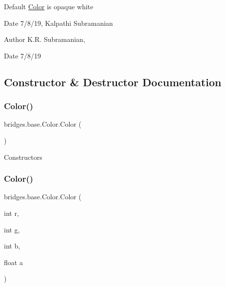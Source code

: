 Default \mbox{\hyperlink{classbridges_1_1base_1_1_color}{Color}} is opaque white

\begin{DoxyDate}{Date}
7/8/19, Kalpathi Subramanian
\end{DoxyDate}
\begin{DoxyAuthor}{Author}
K.\+R. Subramanian, 
\end{DoxyAuthor}
\begin{DoxyDate}{Date}
7/8/19 
\end{DoxyDate}


\subsection{Constructor \& Destructor Documentation}
\mbox{\label{classbridges_1_1base_1_1_color_ab6d71ac2ee1430fb2db2fbe34e692de8}} 
\subsubsection{\texorpdfstring{Color()}{Color()}\hspace{0.1cm}{\footnotesize\ttfamily [1/4]}}
{\footnotesize\ttfamily bridges.\+base.\+Color.\+Color (\begin{DoxyParamCaption}{ }\end{DoxyParamCaption})}

Constructors \mbox{\label{classbridges_1_1base_1_1_color_a15f56590ca3c9cc161c7bfa47060ad21}} 
\subsubsection{\texorpdfstring{Color()}{Color()}\hspace{0.1cm}{\footnotesize\ttfamily [2/4]}}
{\footnotesize\ttfamily bridges.\+base.\+Color.\+Color (\begin{DoxyParamCaption}\item[{int}]{r,  }\item[{int}]{g,  }\item[{int}]{b,  }\item[{float}]{a }\end{DoxyParamCaption})}

